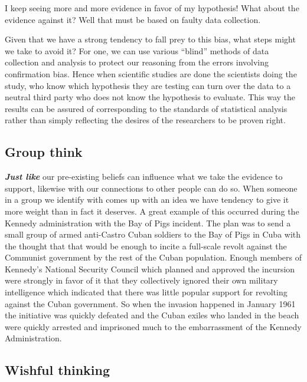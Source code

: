 \documentclass[]{book}
\makeatletter
\newenvironment{kframe}{%
\medskip{}
\setlength{\fboxsep}{.8em}
 \def\at@end@of@kframe{}%
 \ifinner\ifhmode%
  \def\at@end@of@kframe{\end{minipage}}%
  \begin{minipage}{\columnwidth}%
 \fi\fi%
 \def\FrameCommand##1{\hskip\@totalleftmargin \hskip-\fboxsep
 \colorbox{shadecolor}{##1}\hskip-\fboxsep
     \hskip-\linewidth \hskip-\@totalleftmargin \hskip\columnwidth}%
 \MakeFramed {\advance\hsize-\width
   \@totalleftmargin\z@ \linewidth\hsize
   \@setminipage}}%
 {\par\unskip\endMakeFramed%
 \at@end@of@kframe}
\newenvironment{rmdblock}[1]
  {
  \begin{itemize}
  \renewcommand{\labelitemi}{
    \raisebox{-.7\height}[0pt][0pt]{
      {\setkeys{Gin}{width=3em,keepaspectratio}\texttt{[image: img/\#1]}}
    }
  }
  \setlength{\fboxsep}{1em}
  \begin{kframe}
  \item
  }
  {
  \end{kframe}
  \end{itemize}
  }
\newenvironment{rmdwarning}
  {\begin{rmdblock}{warning}}
  {\end{rmdblock}}
\makeatother
\begin{document}
\begin{rmdwarning}
I keep seeing more and more evidence in favor of my hypothesis! What
about the evidence against it? Well that must be based on faulty data
collection.
\end{rmdwarning}

Given that we have a strong tendency to fall prey to this bias, what steps might we take to avoid it? For one, we can use various ``blind'' methods of data collection and analysis to protect our reasoning from the errors involving confirmation bias. Hence when scientific studies are done the scientists doing the study, who know which hypothesis they are testing can turn over the data to a neutral third party who does not know the hypothesis to evaluate. This way the results can be assured of corresponding to the standards of statistical analysis rather than simply reflecting the desires of the researchers to be proven right.

\hypertarget{group-think}{%
\subsection*{Group think}\label{group-think}}


\textbf{\emph{Just like}} our pre-existing beliefs can influence what we take the evidence to support, likewise with our connections to other people can do so. When someone in a group we identify with comes up with an idea we have tendency to give it more weight than in fact it deserves. A great example of this occurred during the Kennedy administration with the Bay of Pigs incident. The plan was to send a small group of armed anti-Castro Cuban soldiers to the Bay of Pigs in Cuba with the thought that that would be enough to incite a full-scale revolt against the Communist government by the rest of the Cuban population. Enough members of Kennedy's National Security Council which planned and approved the incursion were strongly in favor of it that they collectively ignored their own military intelligence which indicated that there was little popular support for revolting against the Cuban government. So when the invasion happened in January 1961 the initiative was quickly defeated and the Cuban exiles who landed in the beach were quickly arrested and imprisoned much to the embarrassment of the Kennedy Administration.\citep{BayPigsGroupthink}

\hypertarget{wishful-thinking}{%
\subsection*{Wishful thinking}\label{wishful-thinking}}
\end{document}
